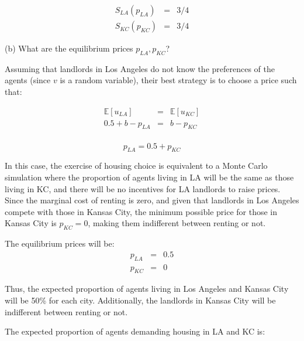 \begin{eqnarray}
    S_{LA}(p_{LA}) &=& 3/4\\
    S_{KC}(p_{KC}) &=& 3/4
\end{eqnarray}
\begin{tcolorbox}
    (b) What are the equilibrium prices \( p_{LA}, p_{KC} \)?
\end{tcolorbox}

Assuming that landlords in Los Angeles do not know the preferences of the agents (since \( v \) is a random variable), their best strategy is to choose a price such that:

\begin{eqnarray*}
    \mathbb{E}[u_{LA}] &=& \mathbb{E}[u_{KC}]\\
    0.5 + b - p_{LA} &=& b - p_{KC}\\
\end{eqnarray*}

\begin{equation}
    p_{LA} = 0.5 + p_{KC}
    \label{eq:equilibrium}
\end{equation}

In this case, the exercise of housing choice is equivalent to a Monte Carlo simulation where the proportion of agents living in LA will be the same as those living in KC, and there will be no incentives for LA landlords to raise prices.\\

Since the marginal cost of renting is zero, and given that landlords in Los Angeles compete with those in Kansas City, the minimum possible price for those in Kansas City is \( p_{KC} = 0 \), making them indifferent between renting or not.


\begin{myanswerbox}
    The equilibrium prices will be:
    \begin{eqnarray*}
        p_{LA} &=& 0.5\\
        p_{KC} &=& 0
    \end{eqnarray*}

    Thus, the expected proportion of agents living in Los Angeles and Kansas City will be 50\% for each city. Additionally, the landlords in Kansas City will be indifferent between renting or not.\\
\end{myanswerbox}

The expected proportion of agents demanding housing in LA and KC is: 

